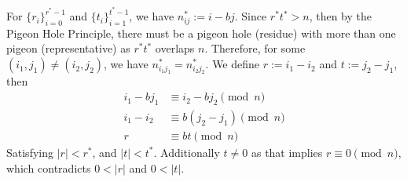 \newpage
\begin{Proof}

    For $\{r_i\}_{i=0}^{r^*-1}$ and $\{t_i\}_{i=1}^{t^*-1}$, we have $n_{ij}^*:=i-bj$.
    Since $r^*t^* > n$, then by the Pigeon Hole Principle, there must be a pigeon hole (residue) with more than one pigeon (representative) as $r^*t^*$ overlaps $n$.
    Therefore, for some $(i_1,j_1)\neq(i_2,j_2)$, we have $n_{i_1j_1}^*=n_{i_2j_2}^*$. We define $r:=i_1-i_2$ and $t:=j_2-j_1$, then
    \begin{align*}
        i_1-bj_1&\equiv i_2-bj_2\pmod{n}\\
        i_1-i_2&\equiv b(j_2-j_1)\pmod{n}\\
        r&\equiv bt\pmod{n}
    \end{align*}
    \noindent
    Satisfying $|r|<r^*$, and $|t|<t^*$. Additionally $t\neq 0$ as that implies $r\equiv 0\pmod{n}$, which contradicts $0<|r|$ and $0<|t|$.
\end{Proof}